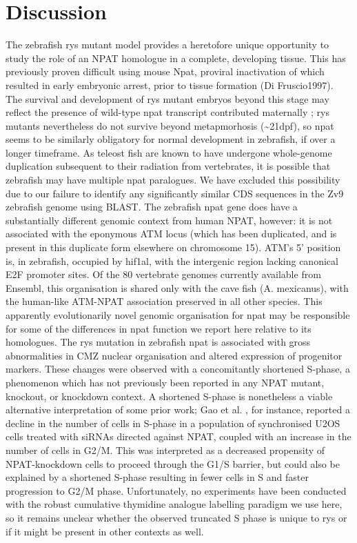 \section{Discussion}
The zebrafish rys mutant model provides a heretofore unique opportunity to study the role of an NPAT homologue in a complete, developing tissue. This has previously proven difficult using mouse Npat, proviral inactivation of which resulted in early embryonic arrest, prior to tissue formation (Di Fruscio1997). The survival and development of rys mutant embryos beyond this stage may reflect the presence of wild-type npat transcript contributed maternally \cite{Harvey2013}; rys mutants nevertheless do not survive beyond metapmorhosis (\textasciitilde{}21dpf), so npat seems to be similarly obligatory for normal development in zebrafish, if over a longer timeframe.
As teleost fish are known to have undergone whole-genome duplication subsequent to their radiation from vertebrates, it is possible that zebrafish may have multiple npat paralogues. We have excluded this possibility due to our failure to identify any significantly similar CDS sequences in the Zv9 zebrafish genome using BLAST. The zebrafish npat gene does have a substantially different genomic context from human NPAT, however: it is not associated with the eponymous ATM locus (which has been duplicated, and is present in this duplicate form elsewhere on chromosome 15). ATM’s 5’ position is, in zebrafish, occupied by hif1al, with the intergenic region lacking canonical E2F promoter sites. Of the 80 vertebrate genomes currently available from Ensembl, this organisation is shared only with the cave fish (A. mexicanus), with the human-like ATM-NPAT association preserved in all other species. This apparently evolutionarily novel genomic organisation for npat may be responsible for some of the differences in npat function we report here relative to its homologues.
The rys mutation in zebrafish npat is associated with gross abnormalities in CMZ nuclear organisation and altered expression of progenitor markers. These changes were observed with a concomitantly shortened S-phase, a phenomenon which has not previously been reported in any NPAT mutant, knockout, or knockdown context. A shortened S-phase is nonetheless a viable alternative interpretation of some prior work; Gao et al. \cite{Gao2003}, for instance, reported a decline in the number of cells in S-phase in a population of synchronised U2OS cells treated with siRNAs directed against NPAT, coupled with an increase in the number of cells in G2/M. This was interpreted as a decreased propensity of NPAT-knockdown cells to proceed through the G1/S barrier, but could also be explained by a shortened S-phase resulting in fewer cells in S and faster progression to G2/M phase. Unfortunately, no experiments have been conducted with the robust cumulative thymidine analogue labelling paradigm we use here, so it remains unclear whether the observed truncated S phase is unique to rys or if it might be present in other contexts as well.
